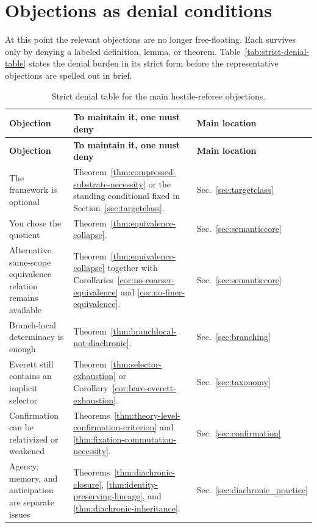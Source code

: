 \section{Objections as denial conditions}
\label{sec:objections}

At this point the relevant objections are no longer free-floating. Each survives only by denying a
labeled definition, lemma, or theorem. Table~\ref{tab:strict-denial-table} states the denial burden in
its strict form before the representative objections are spelled out in brief.

\begin{longtable}{>{\raggedright\arraybackslash}p{} >{\raggedright\arraybackslash}p{} >{\raggedright\arraybackslash}p{}}
\caption{Strict denial table for the main hostile-referee objections.}\\
\toprule
\textbf{Objection} & \textbf{To maintain it, one must deny} & \textbf{Main location} \\
\midrule
\endfirsthead
\toprule
\textbf{Objection} & \textbf{To maintain it, one must deny} & \textbf{Main location} \\
\midrule
\endhead
The framework is optional & Theorem~\ref{thm:compressed-substrate-necessity} or the standing conditional fixed in Section~\ref{sec:targetclass}. & Sec.~\ref{sec:targetclass} \\
\addlinespace
You chose the quotient & Theorem~\ref{thm:equivalence-collapse}. & Sec.~\ref{sec:semanticcore} \\
\addlinespace
Alternative same-scope equivalence relation remains available & Theorem~\ref{thm:equivalence-collapse} together with Corollaries~\ref{cor:no-coarser-equivalence} and \ref{cor:no-finer-equivalence}. & Sec.~\ref{sec:semanticcore} \\
\addlinespace
Branch-local determinacy is enough & Theorem~\ref{thm:branchlocal-not-diachronic}. & Sec.~\ref{sec:branching} \\
\addlinespace
Everett still contains an implicit selector & Theorem~\ref{thm:selector-exhaustion} or Corollary~\ref{cor:bare-everett-exhaustion}. & Sec.~\ref{sec:taxonomy} \\
\addlinespace
Confirmation can be relativized or weakened & Theorems~\ref{thm:theory-level-confirmation-criterion} and \ref{thm:fixation-commutation-necessity}. & Sec.~\ref{sec:confirmation} \\
\addlinespace
Agency, memory, and anticipation are separate issues & Theorems~\ref{thm:diachronic-closure}, \ref{thm:identity-preserving-lineage}, and \ref{thm:diachronic-inheritance}. & Sec.~\ref{sec:diachronic_practice} \\

\end{longtable}
